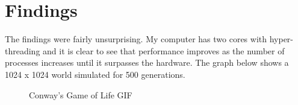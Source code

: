 \documentclass{article}
\begin{document}
\section*{Findings} The findings were fairly unsurprising. My computer has two cores with hyper-threading and it is clear to see that performance improves as the number of processes increases until it surpasses the hardware. The graph below shows a 1024 x 1024 world simulated for 500 generations.

\begin{figure}[!htbp]
    \centering
    \label{fig:graph1}
\end{figure}

\begin{figure}[!htbp]
  \caption{Conway's Game of Life GIF}
\end{figure}
\end{document}
